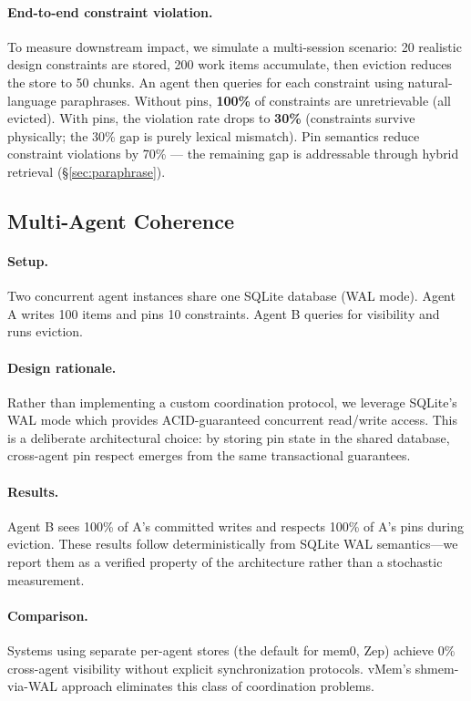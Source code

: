 \documentclass[10pt,twocolumn]{article}
\begin{document}
\paragraph{End-to-end constraint violation.} To measure downstream impact, we simulate a multi-session scenario: 20 realistic design constraints are stored, 200 work items accumulate, then eviction reduces the store to 50 chunks. An agent then queries for each constraint using natural-language paraphrases. Without pins, \textbf{100\%} of constraints are unretrievable (all evicted). With pins, the violation rate drops to \textbf{30\%} (constraints survive physically; the 30\% gap is purely lexical mismatch). Pin semantics reduce constraint violations by 70\% --- the remaining gap is addressable through hybrid retrieval (\S\ref{sec:paraphrase}).

\subsection{Multi-Agent Coherence}

\paragraph{Setup.} Two concurrent agent instances share one SQLite database (WAL mode). Agent A writes 100 items and pins 10 constraints. Agent B queries for visibility and runs eviction.

\paragraph{Design rationale.} Rather than implementing a custom coordination protocol, we leverage SQLite's WAL mode which provides ACID-guaranteed concurrent read/write access. This is a deliberate architectural choice: by storing pin state in the shared database, cross-agent pin respect emerges from the same transactional guarantees.

\paragraph{Results.} Agent B sees 100\% of A's committed writes and respects 100\% of A's pins during eviction. These results follow deterministically from SQLite WAL semantics---we report them as a verified property of the architecture rather than a stochastic measurement.

\paragraph{Comparison.} Systems using separate per-agent stores (the default for mem0, Zep) achieve 0\% cross-agent visibility without explicit synchronization protocols. vMem's shmem-via-WAL approach eliminates this class of coordination problems.
\end{document}
